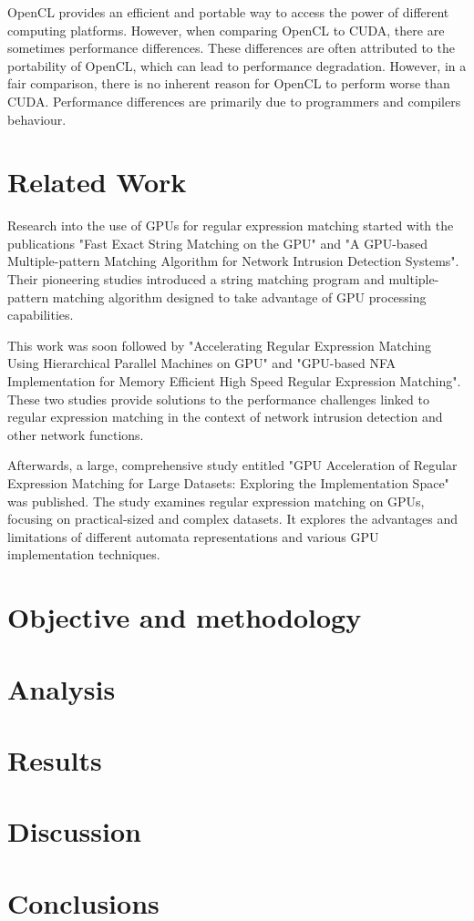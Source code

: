 \documentclass[10pt,onecolumn,twoside,english,a4paper]{article}
\begin{document}
OpenCL provides an efficient and portable way to access the power of different computing platforms. However, when comparing OpenCL to CUDA, there are sometimes performance differences. These differences are often attributed to the portability of OpenCL, which can lead to performance degradation. However, in a fair comparison, there is no inherent reason for OpenCL to perform worse than CUDA. Performance differences are primarily due to programmers and compilers behaviour\cite{Fang:Comparison-cuda-opencl}.

\section{Related Work} \label{Related work}
Research into the use of GPUs for regular expression matching started with the publications "Fast Exact String Matching on the GPU"\cite{schatz2007fast} and "A GPU-based Multiple-pattern Matching Algorithm for Network Intrusion
Detection Systems"\cite{huang2008gpu}. Their pioneering studies introduced a string matching program and multiple-pattern matching algorithm designed to take advantage of GPU processing capabilities.

This work was soon followed by "Accelerating Regular Expression Matching Using Hierarchical Parallel Machines on GPU"\cite{Lin:regex_gpu_parallel} and "GPU-based NFA Implementation for Memory Efficient High Speed Regular Expression Matching"\cite{Zu:GPU-NFA}. These two studies provide solutions to the performance challenges linked to regular expression matching in the context of network intrusion detection and other network functions.

Afterwards, a large, comprehensive study entitled "GPU Acceleration of Regular Expression Matching for Large Datasets: Exploring the Implementation Space"\cite{Becchi:regex_large_dataset} was published. The study examines regular expression matching on GPUs, focusing on practical-sized and complex datasets. It explores the advantages and limitations of different automata representations and various GPU implementation techniques.


\section{Objective and methodology} \label{Objective}

\section{Analysis} \label{Analysis}

\section{Results} \label{Results}

\section{Discussion} \label{Discussion}

\section{Conclusions} \label{Conclusions} %



\end{document}
